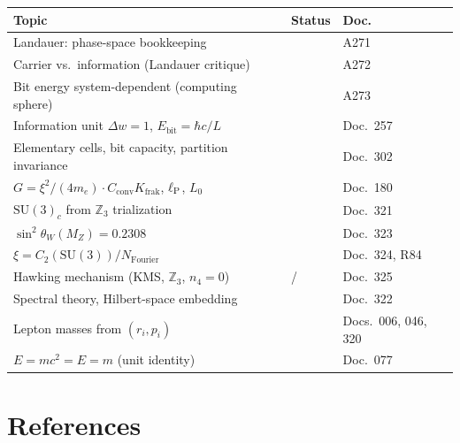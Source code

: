\begin{center}\small
\begin{tabular}{@{}lll@{}}
  \toprule
  \textbf{Topic} & \textbf{Status} & \textbf{Doc.} \\
  \midrule
  Landauer: phase-space bookkeeping & \K & A271 \\
  Carrier vs.\ information (Landauer critique) & \K & A272 \\
  Bit energy system-dependent (computing sphere) & \K & A273 \\
  Information unit $\Delta w = 1$, $E_{\mathrm{bit}} = \hbar c/L$ & \K & Doc.\ 257 \\
  Elementary cells, bit capacity, partition invariance & \K & Doc.\ 302 \\
  $G = \xi^2/(4m_e)\cdot C_{\text{conv}}K_{\text{frak}}$, $\ell_{\mathrm{P}}$, $L_0$ & \K & Doc.\ 180 \\
  $\mathrm{SU}(3)_c$ from $\mathbb{Z}_3$ trialization & \B & Doc.\ 321 \\
  $\sin^2\theta_W(M_Z) = 0.2308$ & \K & Doc.\ 323 \\
  $\xi = C_2(\mathrm{SU}(3))/N_{\mathrm{Fourier}}$ & \K & Doc.\ 324, R84 \\
  Hawking mechanism (KMS, $\mathbb{Z}_3$, $n_4{=}0$) & \K/\B & Doc.\ 325 \\
  Spectral theory, Hilbert-space embedding & \K & Doc.\ 322 \\
  Lepton masses from $(r_i, p_i)$ & \K & Docs.\ 006, 046, 320 \\
  $E = mc^2 = E = m$ (unit identity) & \K & Doc.\ 077 \\
  \bottomrule
\end{tabular}
\end{center}

\section*{References}

